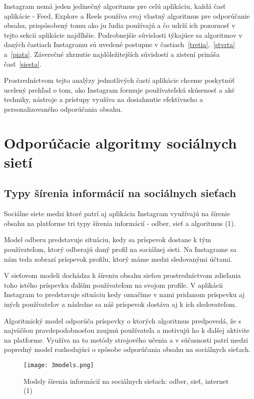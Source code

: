 \documentclass[10pt,twoside,slovak,a4paper]{article}
\begin{document}
Instagram nemá jeden jedinečný algoritmus pre celú aplikáciu, každá časť aplikácie - Feed, Explore a Reels používa svoj vlastný algoritmus pre odporúčanie obsahu, prispôsobený tomu ako ju ľudia používajú a čo udrží ich pozornosť v tejto sekcii aplikácie najdlhšie. Podrobnejšie súvislosti týkajúce sa algoritmov v daných častiach Instagramu sú uvedené postupne v častiach~\ref{tretia},~\ref{stvrta} a~\ref{piata}. Záverečné zhrnutie najdôležitejších súvislostí a zistení prináša časť~\ref{siesta}.

Prostredníctvom tejto analýzy jednotlivých častí aplikácie chceme poskytnúť ucelený prehľad o tom, ako Instagram formuje používateľskú skúsenosť a aké techniky, nástroje a prístupy využíva na dosiahnutie efektívneho a personalizovaného odporúčania obsahu.




\section{Odporúčacie algoritmy sociálnych sietí} \label{druha}

\subsection{Typy šírenia informácií na sociálnych sieťach} 
Sociálne siete medzi ktoré patrí aj aplikácia Instagram využívajú na šírenie obsahu na platforme tri typy šírenia informácií - odber, sieť a algoritmus (1).

Model odberu predstavuje situáciu, kedy sa príspevok dostane k tým používateľom, ktorý odberajú daný profil na sociálnej sieti. Na Instagrame sa nám teda zobrazí príspevok profilu, ktorý máme medzi sledovanými účtami.

V sieťovom modeli dochádza k šíreniu obsahu sieťou prostredníctvom zdieľania toho istého príspevku ďalším používateľom na svojom profile. V aplikácii Instagram to predstavuje situáciu kedy označíme v nami pridanom príspevku aj iných používateľov a následne sa náš príspevok dostáva aj k ich sledovateľom.

Algoritmický model odporúča príspevky o ktorých algoritmus predpovedá, že s najväčšou pravdepodobnosťou zaujmú používateľa a motivujú ho k ďalšej aktivite na platforme. Využíva na to metódy strojového učenia a v súčasnosti patrí medzi popredný model rozhodujúci o spôsobe odporúčania obsahu na sociálnych sieťach.

\begin{figure*}[tbh]
\centering
\texttt{[image: 3models.png]}
\caption{Modely šírenia informácií na sociálnych sieťach: odber, sieť, internet (1)}
\end{figure*}
\end{document}
